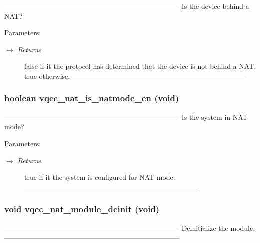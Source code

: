 --------------------------------------------------------------------------- Is the device behind a NAT?

\begin{Desc}
\item[Parameters:]
\begin{description}
\item[\mbox{$\rightarrow$} {\em Returns}]false if it the protocol has determined that the device is not behind a NAT, true otherwise. --------------------------------------------------------------------------- \end{description}
\end{Desc}
\subsubsection{\setlength{\rightskip}{0pt plus 5cm}boolean vqec\_\-nat\_\-is\_\-natmode\_\-en (void)}\label{vqec__nat__interface_8h_3633769cdfeadc830826ee6ff1da092d}


--------------------------------------------------------------------------- Is the system in NAT mode?

\begin{Desc}
\item[Parameters:]
\begin{description}
\item[\mbox{$\rightarrow$} {\em Returns}]true if it the system is configured for NAT mode. --------------------------------------------------------------------------- \end{description}
\end{Desc}
\subsubsection{\setlength{\rightskip}{0pt plus 5cm}void vqec\_\-nat\_\-module\_\-deinit (void)}\label{vqec__nat__interface_8h_a36b72241b333e6268eb9c0bc3761449}


--------------------------------------------------------------------------- Deinitialize the module. --------------------------------------------------------------------------- 
